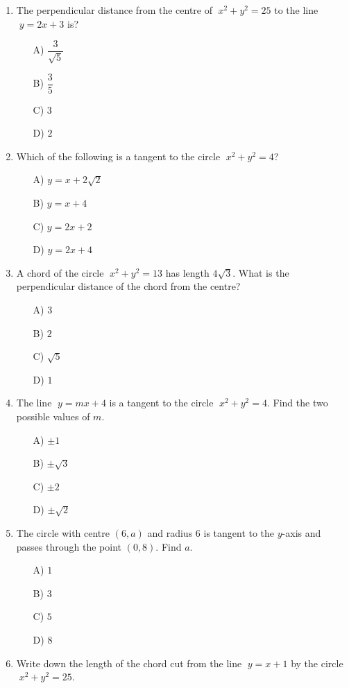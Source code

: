 \documentclass[11pt,a4paper]{article}
\begin{document}
\begin{enumerate}
\item The perpendicular distance from the centre of $\;x^2+y^2=25$ to the line $\;y = 2x + 3$ is?
\begin{itemize}
\item[A)] $\dfrac{3}{\sqrt{5}}$
\item[B)] $\dfrac{3}{5}$
\item[C)] $3$
\item[D)] $2$
\end{itemize}

\item Which of the following is a tangent to the circle $\;x^2+y^2=4$?
\begin{itemize}
\item[A)] $y = x + 2\sqrt{2}$
\item[B)] $y = x + 4$
\item[C)] $y = 2x + 2$
\item[D)] $y = 2x + 4$
\end{itemize}

\item A chord of the circle $\;x^2+y^2=13$ has length $4\sqrt{3}$. What is the perpendicular distance of the chord from the centre?
\begin{itemize}
\item[A)] $3$
\item[B)] $2$
\item[C)] $\sqrt{5}$
\item[D)] $1$
\end{itemize}

\item The line $\;y = mx + 4$ is a tangent to the circle $\;x^2+y^2=4$. Find the two possible values of $m$.
\begin{itemize}
\item[A)] $\pm 1$
\item[B)] $\pm \sqrt{3}$
\item[C)] $\pm 2$
\item[D)] $\pm \sqrt{2}$
\end{itemize}

\item The circle with centre $(6,a)$ and radius $6$ is tangent to the $y$-axis and passes through the point $(0,8)$. Find $a$.
\begin{itemize}
\item[A)] $1$
\item[B)] $3$
\item[C)] $5$
\item[D)] $8$
\end{itemize}

\item Write down the length of the chord cut from the line $\;y = x + 1$ by the circle $\;x^2+y^2=25$.

\end{enumerate}
\end{document}
